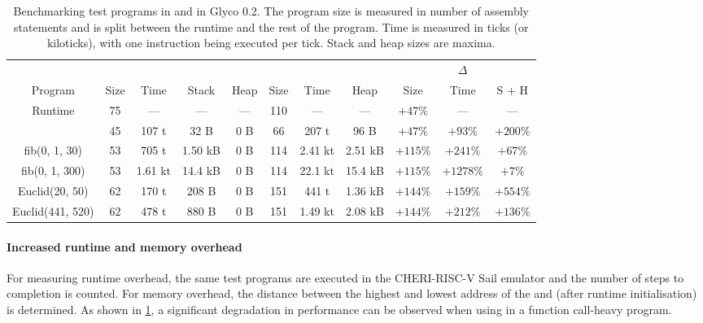 \documentclass[main.tex]{subfiles}
\begin{document}
\begin{table}[ht]
	\medskip	%
	\begin{adjustwidth}{-1in}{-1in}
		\centering
		\footnotesize
		\begin{tabular}{ccccccccccc}
			\toprule
								& \multicolumn{4}{c}{\g{gccc}}			& \multicolumn{3}{c}{\g{ghscc}}		& \multicolumn{3}{c}{$\Delta$}		\\
								\cmidrule(lr){2-5}						\cmidrule(lr){6-8}					\cmidrule(lr){9-11}
			Program				& Size	& Time		& Stack		& Heap	& Size	& Time		& Heap		& Size		& Time		& S + H		\\
			\midrule
			Runtime				& 75	& —			& —			& —		& 110	& —			& —			& $+47\%$	& —			& —			\\
			\addlinespace
			42					& 45	& 107 t		& 32 B		& 0 B	& 66	& 207 t		& 96 B		& $+47\%$	& $+93\%$	& $+200\%$	\\
			fib(0, 1, 30)		& 53	& 705 t		& 1.50 kB	& 0 B	& 114	& 2.41 kt	& 2.51 kB	& $+115\%$	& $+241\%$	& $+67\%$	\\
			fib(0, 1, 300)		& 53	& 1.61 kt	& 14.4 kB	& 0 B	& 114	& 22.1 kt	& 15.4 kB	& $+115\%$	& $+1278\%$	& $+7\%$	\\
			Euclid(20, 50)		& 62	& 170 t		& 208 B		& 0 B	& 151	& 441 t		& 1.36 kB	& $+144\%$	& $+159\%$	& $+554\%$	\\
			Euclid(441, 520)	& 62	& 478 t		& 880 B		& 0 B	& 151	& 1.49 kt	& 2.08 kB	& $+144\%$	& $+212\%$	& $+136\%$	\\
			\bottomrule
		\end{tabular}
	\end{adjustwidth}
	\caption{Benchmarking test programs in  and  in Glyco 0.2. The program size is measured in number of assembly statements and is split between the runtime and the rest of the program. Time is measured in ticks (or kiloticks), with one instruction being executed per tick. Stack and heap sizes are maxima.}
	\label{tbl:ghscc-size}
\end{table}

\paragraph{Increased runtime and memory overhead} For measuring runtime overhead, the same test programs are executed in the CHERI-RISC-V Sail emulator and the number of steps to completion is counted. For memory overhead, the distance between the highest and lowest address of the  and  (after runtime initialisation) is determined. As shown in \cref{tbl:ghscc-size}, a significant degradation in performance can be observed when using  in a function call-heavy program.
\end{document}
